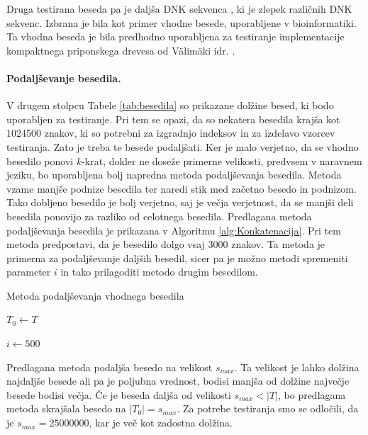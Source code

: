 Druga testirana beseda pa je daljša DNK sekvenca \cite{podatki}, ki je zlepek različnih DNK sekvenc. Izbrana je bila kot primer vhodne besede, uporabljene v bioinformatiki. Ta vhodna beseda je bila predhodno uporabljena za testiranje implementacije kompaktnega priponskega drevesa od Välimäki idr. \cite{Valimaki2007}.

\paragraph{Podaljševanje besedila.}

V drugem stolpcu Tabele \ref{tab:besedila} so prikazane dolžine besed, ki bodo uporabljen za testiranje. Pri tem se opazi, da so nekatera besedila krajša kot 1024500 znakov, ki so potrebni za izgradnjo indeksov in za izdelavo vzorcev testiranja. Zato je treba te besede podaljšati. Ker je malo verjetno, da se vhodno besedilo ponovi $k$-krat, dokler ne doseže primerne velikosti, predvsem v naravnem jeziku, bo uporabljena bolj napredna metoda podaljševanja besedila. Metoda vzame manjše podnize besedila ter naredi stik med začetno besedo in podnizom. Tako dobljeno besedilo je bolj verjetno, saj je večja verjetnost, da se manjši deli besedila ponovijo za razliko od celotnega besedila. Predlagana metoda podaljševanja besedila je prikazana v Algoritmu \ref{alg:Konkatenacija}. Pri tem metoda predpostavi, da je besedilo dolgo vsaj $3000$ znakov. Ta metoda je primerna za podaljševanje daljših besedil, sicer pa je možno metodi spremeniti parameter $i$ in tako prilagoditi metodo drugim besedilom.


\begin{algorithm}[htb]

\caption{Metoda podaljševanja vhodnega besedila}\label{alg:Konkatenacija}
{
    {$T_0\leftarrow T$}

    {$i\leftarrow 500$}
    
    
}
\end{algorithm}

Predlagana metoda podaljša besedo na velikost $s_{max}$. Ta velikost je lahko dolžina najdaljše besede ali pa je poljubna vrednost, bodisi manjša od dolžine največje besede bodisi večja. Če je beseda daljša od velikosti $s_{max}<|T|$, bo predlagana metoda skrajšala besedo na $|T_0|=s_{max}$. Za potrebe testiranja smo se odločili, da je $s_{max}=25000000$, kar je več kot zadostna dolžina.

